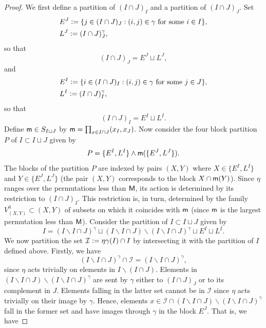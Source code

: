 \documentclass[10pt,a4paper]{amsart}
\newcommand{\sM}{{\sf M}}
\begin{document}
\begin{proof}
    We first define a partition of $(I \cap J)_I$ and a partition of $(I \cap J)_J$. Set
    \begin{align*}
		 & E^J \vcentcolon= \{ j \in (I\cap J)_J : (i,j) \in  \gamma \text{ for some } i \in I \},         \\
		 & L^J \vcentcolon= (I\cap J)_J^{\gamma},
	\end{align*}
	so that
    \begin{equation*}
        (I\cap J)_J = E^J\sqcup L^J,
    \end{equation*}
    and
     \begin{align*}
		 & E^I \vcentcolon= \{ i \in (I\cap J)_I : (i,j) \in  \gamma \text{ for some } j \in J \},         \\
		 & L^I \vcentcolon= (I\cap J)_I^{\gamma},
	\end{align*}
    so that 
    \begin{equation*}
        (I\cap J)_I = E^I \sqcup L^I.
    \end{equation*}
   Define ${\sf m} \in S_{I \sqcup J}$ by ${\sf m} = \prod_{x \in I \cap J}(x_I, x_J)$. Now consider the four block partition $P$ of $I \subset I \sqcup J$  given by
    \begin{equation*}
        P = \{E^I, L^I\} \wedge {\sf m}(\{E^J, L^J\}).
    \end{equation*}
    The blocks of the partition $P$ are indexed by pairs $(X,Y)$ where $X \in \{E^I,L^I\}$ and $Y \in \{E^J, L^J\}$ (the pair $(X,Y)$ corresponds to the block $X \cap {\sf m}(Y)$).
    Since $\eta$ ranges over the permutations less than $\sM$, its action is determined by its restriction to $(I\cap J)_I$. This restriction is, in turn, determined by the family $V^{\eta}_{(X,Y)} \subset (X,Y)$ of subsets on which it coincides with  ${\sf m}$ (since ${\sf m}$ is the largest permutation less than ${\sf M}$).
    Consider the partition of $I \subset I \sqcup J$ given by
    $$
    I =(I\backslash I\cap J)^{\gamma} \sqcup (I\backslash I\cap J)\backslash (I\backslash I\cap J)^{\gamma}\sqcup E^I \sqcup L^I.
    $$ We now partition the set $\mathcal{I}\vcentcolon= \eta\gamma(I) \cap I$ by intersecting it with the partition of $I$ defined above. Firstly, we have
	$$
		(I\backslash I\cap J)^{\gamma} \cap \mathcal{I}=(I\backslash I\cap J)^{\gamma},
	$$
	since $\eta$ acts trivially on elements in $I\backslash (I \cap J)$. Elements in $(I\backslash I\cap J)\backslash(I\backslash I\cap J)^{\gamma}$ are sent by $\gamma$ either to $(I\cap J)_J$ or to its complement in $J$. Elements falling in the latter set cannot be in $\mathcal{I}$ since $\eta$ acts trivially on their image by $\gamma$. Hence, elements $x \in \mathcal{I}\cap (I\backslash I\cap J)\backslash(I\backslash I\cap J)^{\gamma}$ fall in the former set and have images through $\gamma$ in the block $E^J$. That is, we have 

\end{proof}
\end{document}
